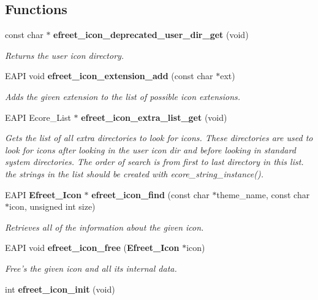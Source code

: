 \subsection*{Functions}
\begin{CompactItemize}
\item 
const char $\ast$ {\bf efreet\_\-icon\_\-deprecated\_\-user\_\-dir\_\-get} (void)
\begin{CompactList}\small\item\em Returns the user icon directory. \item\end{CompactList}\item 
EAPI void {\bf efreet\_\-icon\_\-extension\_\-add} (const char $\ast$ext)
\begin{CompactList}\small\item\em Adds the given extension to the list of possible icon extensions. \item\end{CompactList}\item 
EAPI Ecore\_\-List $\ast$ {\bf efreet\_\-icon\_\-extra\_\-list\_\-get} (void)
\begin{CompactList}\small\item\em Gets the list of all extra directories to look for icons. These directories are used to look for icons after looking in the user icon dir and before looking in standard system directories. The order of search is from first to last directory in this list. the strings in the list should be created with ecore\_\-string\_\-instance(). \item\end{CompactList}\item 
EAPI {\bf Efreet\_\-Icon} $\ast$ {\bf efreet\_\-icon\_\-find} (const char $\ast$theme\_\-name, const char $\ast$icon, unsigned int size)
\begin{CompactList}\small\item\em Retrieves all of the information about the given icon. \item\end{CompactList}\item 
EAPI void {\bf efreet\_\-icon\_\-free} ({\bf Efreet\_\-Icon} $\ast$icon)
\begin{CompactList}\small\item\em Free's the given icon and all its internal data. \item\end{CompactList}\item 
int {\bf efreet\_\-icon\_\-init} (void)

\end{CompactItemize}
